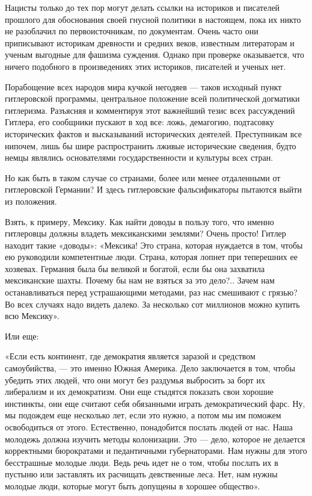 \documentclass[12pt, a4paper, openany]{book}
\begin{document}
Нацисты только до тех пор могут делать ссылки на историков и писателей прошлого для обоснования своей гнусной политики в настоящем, пока их никто не разоблачил по первоисточникам, по документам. Очень часто они приписывают историкам древности и средних веков, известным литераторам и ученым выгодные для фашизма суждения. Однако при проверке оказывается, что ничего подобного в произведениях этих историков, писателей и ученых нет.

Порабощение всех народов мира кучкой негодяев — таков исходный пункт гитлеровской программы, центральное положение всей политической догматики гитлеризма. Разъясняя и комментируя этот важнейший тезис всех рассуждений Гитлера, его сообщники пускают в ход все: ложь, демагогию, подтасовку исторических фактов и высказываний исторических деятелей. Преступникам все нипочем, лишь бы шире распространить лживые исторические сведения, будто немцы являлись основателями государственности и культуры всех стран.

Но как быть в таком случае со странами, более или менее отдаленными от гитлеровской Германии? И здесь гитлеровские фальсификаторы пытаются выйти из положения.

Взять, к примеру, Мексику. Как найти доводы в пользу того, что именно гитлеровцы должны владеть мексиканскими землями? Очень просто! Гитлер находит такие «доводы»: «Мексика! Это страна, которая нуждается в том, чтобы ею руководили компетентные люди. Страна, которая лопнет при теперешних ее хозяевах. Германия была бы великой и богатой, если бы она захватила мексиканские шахты. Почему бы нам не взяться за это дело?.. Зачем нам останавливаться перед устрашающими методами, раз нас смешивают с грязью? Во всех случаях надо видеть далеко. За несколько сот миллионов можно купить всю Мексику».

Или еще:

«Если есть континент, где демократия является заразой и средством самоубийства, — это именно Южная Америка. Дело заключается в том, чтобы убедить этих людей, что они могут без раздумья выбросить за борт их либерализм и их демократизм. Они еще стыдятся показать свои хорошие инстинкты, они еще считают себя обязанными играть демократический фарс. Ну, мы подождем еще несколько лет, если это нужно, а потом мы им поможем освободиться от этого. Естественно, понадобится послать людей от нас. Наша молодежь должна изучить методы колонизации. Это — дело, которое не делается корректными бюрократами и педантичными губернаторами. Нам нужны для этого бесстрашные молодые люди. Ведь речь идет не о том, чтобы послать их в пустыню или заставлять их расчищать девственные леса. Нет, нам нужны молодые люди, которые могут быть допущены в хорошее общество».
\end{document}
